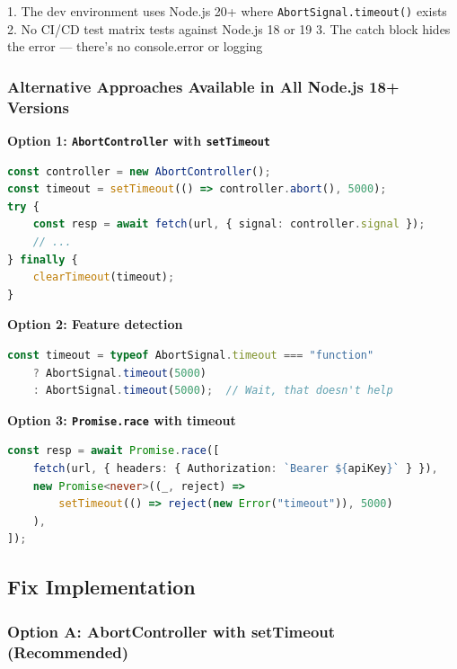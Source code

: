 1. The dev environment uses Node.js 20+ where \texttt{AbortSignal.timeout()} exists
2. No CI/CD test matrix tests against Node.js 18 or 19
3. The catch block hides the error — there's no console.error or logging

\subsubsection*{Alternative Approaches Available in All Node.js 18+ Versions}

\textbf{Option 1: \texttt{AbortController} with \texttt{setTimeout}}


\begin{lstlisting}[language=TypeScript]
const controller = new AbortController();
const timeout = setTimeout(() => controller.abort(), 5000);
try {
    const resp = await fetch(url, { signal: controller.signal });
    // ...
} finally {
    clearTimeout(timeout);
}

\end{lstlisting}



\textbf{Option 2: Feature detection}


\begin{lstlisting}[language=TypeScript]
const timeout = typeof AbortSignal.timeout === "function"
    ? AbortSignal.timeout(5000)
    : AbortSignal.timeout(5000);  // Wait, that doesn't help

\end{lstlisting}



\textbf{Option 3: \texttt{Promise.race} with timeout}


\begin{lstlisting}[language=TypeScript]
const resp = await Promise.race([
    fetch(url, { headers: { Authorization: `Bearer ${apiKey}` } }),
    new Promise<never>((_, reject) =>
        setTimeout(() => reject(new Error("timeout")), 5000)
    ),
]);

\end{lstlisting}




\subsection*{Fix Implementation}
\subsubsection*{Option A: AbortController with setTimeout (Recommended)}



